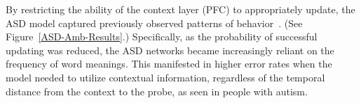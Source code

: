 By restricting the ability of the context layer (PFC) to appropriately update, the ASD model captured previously observed patterns of behavior~\cite{HappeF:1997:WCCHomographs}. (See Figure~\ref{ASD-Amb-Results}.) Specifically, as the probability of successful updating was reduced, the ASD networks became increasingly reliant on the frequency of word meanings. This manifested in higher error rates when the model needed to utilize contextual information, regardless of the temporal distance from the context to the probe, as seen in people with autism.


